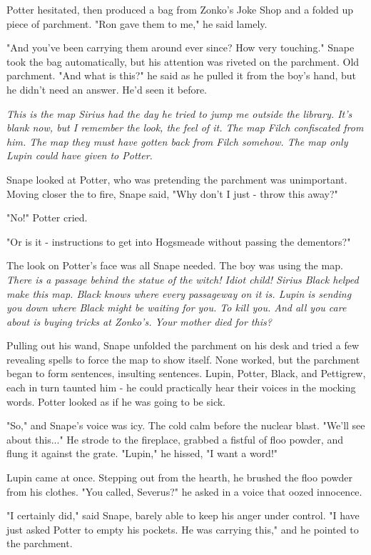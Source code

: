 Potter hesitated, then produced a bag from Zonko's Joke Shop and a folded up piece of parchment. "Ron gave them to me," he said lamely.

"And you've been carrying them around ever since? How very touching." Snape took the bag automatically, but his attention was riveted on the parchment. Old parchment. "And what is this?" he said as he pulled it from the boy's hand, but he didn't need an answer. He'd seen it before.

\emph{This is the map Sirius had the day he tried to jump me outside the library. It's blank now, but I remember the look, the feel of it. The map Filch confiscated from him. The map they must have gotten back from Filch somehow. The map only Lupin could have given to Potter.}

Snape looked at Potter, who was pretending the parchment was unimportant. Moving closer the to fire, Snape said, "Why don't I just - throw this away?"

"No!" Potter cried.

"Or is it - instructions to get into Hogsmeade without passing the dementors?"

The look on Potter's face was all Snape needed. The boy was using the map. \emph{There is a passage behind the statue of the witch! Idiot child! Sirius Black helped make this map. Black knows where every passageway on it is. Lupin is sending you down where Black might be waiting for you. To kill you. And all you care about is buying tricks at Zonko's. Your mother died for this?}

Pulling out his wand, Snape unfolded the parchment on his desk and tried a few revealing spells to force the map to show itself. None worked, but the parchment began to form sentences, insulting sentences. Lupin, Potter, Black, and Pettigrew, each in turn taunted him - he could practically hear their voices in the mocking words. Potter looked as if he was going to be sick.

"So," and Snape's voice was icy. The cold calm before the nuclear blast. "We'll see about this..." He strode to the fireplace, grabbed a fistful of floo powder, and flung it against the grate. "Lupin," he hissed, "I want a word!"

Lupin came at once. Stepping out from the hearth, he brushed the floo powder from his clothes. "You called, Severus?" he asked in a voice that oozed innocence.

"I certainly did," said Snape, barely able to keep his anger under control. "I have just asked Potter to empty his pockets. He was carrying this," and he pointed to the parchment.

